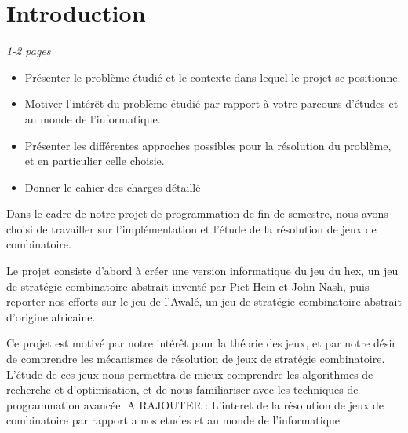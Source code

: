 \documentclass[a4paper]{article} %
\begin{document}



\newpage

\tableofcontents  %

\newpage
\section*{Introduction} %
\emph{1-2 pages}
\begin{itemize}%
\item Présenter le problème étudié et le contexte dans lequel le projet se positionne.
\item Motiver l'intérêt du problème étudié par rapport à votre parcours d'études et au monde de l'informatique.
\item	Présenter les différentes approches possibles pour la résolution du problème, et en particulier celle choisie.
\item Donner le cahier des charges détaillé
\end{itemize}

Dans le cadre de notre projet de programmation de fin de semestre,
nous avons choisi de travailler sur l'implémentation et l'étude de la résolution de jeux de combinatoire.

Le projet consiste d'abord à créer une version informatique du jeu du hex,
un jeu de stratégie combinatoire abstrait inventé par Piet Hein et John Nash,
puis reporter nos efforts sur le jeu de l'Awalé, 
un jeu de stratégie combinatoire abstrait d'origine africaine.

Ce projet est motivé par notre intérêt pour la théorie des jeux,
et par notre désir de comprendre les mécanismes de résolution de jeux de stratégie combinatoire.
L'étude de ces jeux nous permettra de mieux comprendre les algorithmes de recherche et d'optimisation,
et de nous familiariser avec les techniques de programmation avancée.
A RAJOUTER : L'interet de la résolution de jeux de combinatoire par rapport a nos etudes et au monde de l'informatique
\end{document}
